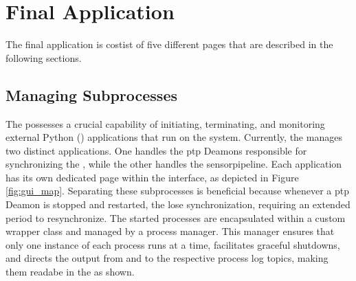 \section{Final Application}
The final application is costist of five different pages that are described in the following sections.

\subsection{Managing Subprocesses}
The \srgui possesses a crucial capability of initiating, terminating, and monitoring external Python (\py) applications that run on the \jx system.
Currently, the \srgui manages two distinct \py applications.
One handles the \gls{ptp} Deamons responsible for synchronizing the \cams, while the other handles the \gls{sensorpipeline}.
Each application has its own dedicated page within the \srgui interface, as depicted in Figure \ref{fig:gui_map}.
Separating these subprocesses is beneficial because whenever a \gls{ptp} Deamon is stopped and restarted, the \cams lose synchronization, requiring an extended period to resynchronize.
The started processes are encapsulated within a custom wrapper class and managed by a process manager.
This manager ensures that only one instance of each process runs at a time, facilitates graceful shutdowns, and directs the output from  and  to the respective process log topics, making them readabe in the \srgui as shown.

